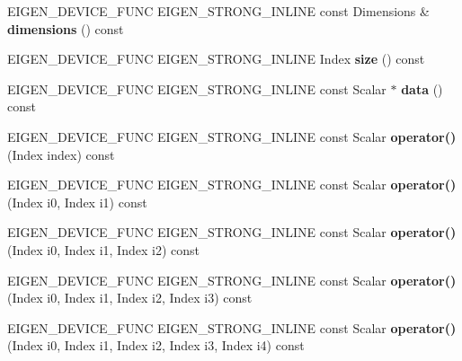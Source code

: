 \begin{DoxyCompactItemize}
E\+I\+G\+E\+N\+\_\+\+D\+E\+V\+I\+C\+E\+\_\+\+F\+U\+NC E\+I\+G\+E\+N\+\_\+\+S\+T\+R\+O\+N\+G\+\_\+\+I\+N\+L\+I\+NE const Dimensions \& {\bfseries dimensions} () const
\item 
\mbox{\label{class_eigen_1_1_tensor_ref_afcb7bafd174509c22f7ab4c9fbc61ed4}} 
E\+I\+G\+E\+N\+\_\+\+D\+E\+V\+I\+C\+E\+\_\+\+F\+U\+NC E\+I\+G\+E\+N\+\_\+\+S\+T\+R\+O\+N\+G\+\_\+\+I\+N\+L\+I\+NE Index {\bfseries size} () const
\item 
\mbox{\label{class_eigen_1_1_tensor_ref_aa15f5c0740dfac2769e31a3356a8db96}} 
E\+I\+G\+E\+N\+\_\+\+D\+E\+V\+I\+C\+E\+\_\+\+F\+U\+NC E\+I\+G\+E\+N\+\_\+\+S\+T\+R\+O\+N\+G\+\_\+\+I\+N\+L\+I\+NE const Scalar $\ast$ {\bfseries data} () const
\item 
\mbox{\label{class_eigen_1_1_tensor_ref_af2d8a0861ccb8ca92170be087a2e78d4}} 
E\+I\+G\+E\+N\+\_\+\+D\+E\+V\+I\+C\+E\+\_\+\+F\+U\+NC E\+I\+G\+E\+N\+\_\+\+S\+T\+R\+O\+N\+G\+\_\+\+I\+N\+L\+I\+NE const Scalar {\bfseries operator()} (Index index) const
\item 
\mbox{\label{class_eigen_1_1_tensor_ref_ac573488a34ff25e70a857005381206f3}} 
E\+I\+G\+E\+N\+\_\+\+D\+E\+V\+I\+C\+E\+\_\+\+F\+U\+NC E\+I\+G\+E\+N\+\_\+\+S\+T\+R\+O\+N\+G\+\_\+\+I\+N\+L\+I\+NE const Scalar {\bfseries operator()} (Index i0, Index i1) const
\item 
\mbox{\label{class_eigen_1_1_tensor_ref_aaf8233e85fc456f3c03264e20fcf9b50}} 
E\+I\+G\+E\+N\+\_\+\+D\+E\+V\+I\+C\+E\+\_\+\+F\+U\+NC E\+I\+G\+E\+N\+\_\+\+S\+T\+R\+O\+N\+G\+\_\+\+I\+N\+L\+I\+NE const Scalar {\bfseries operator()} (Index i0, Index i1, Index i2) const
\item 
\mbox{\label{class_eigen_1_1_tensor_ref_a92d67026d3e3d1ec5387ecebccc3a1a3}} 
E\+I\+G\+E\+N\+\_\+\+D\+E\+V\+I\+C\+E\+\_\+\+F\+U\+NC E\+I\+G\+E\+N\+\_\+\+S\+T\+R\+O\+N\+G\+\_\+\+I\+N\+L\+I\+NE const Scalar {\bfseries operator()} (Index i0, Index i1, Index i2, Index i3) const
\item 
\mbox{\label{class_eigen_1_1_tensor_ref_a3bc931c7bac0c4d57c4aa16003cc612b}} 
E\+I\+G\+E\+N\+\_\+\+D\+E\+V\+I\+C\+E\+\_\+\+F\+U\+NC E\+I\+G\+E\+N\+\_\+\+S\+T\+R\+O\+N\+G\+\_\+\+I\+N\+L\+I\+NE const Scalar {\bfseries operator()} (Index i0, Index i1, Index i2, Index i3, Index i4) const

\end{DoxyCompactItemize}
